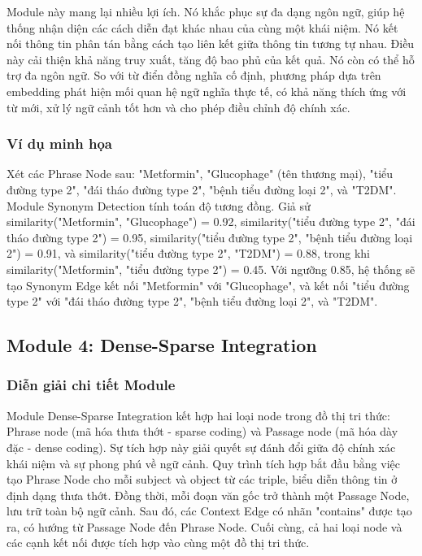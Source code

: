 \documentclass{article}
\begin{document}
Module này mang lại nhiều lợi ích. Nó khắc phục sự đa dạng ngôn ngữ, giúp hệ thống nhận diện các cách diễn đạt khác nhau của cùng một khái niệm. Nó kết nối thông tin phân tán bằng cách tạo liên kết giữa thông tin tương tự nhau. Điều này cải thiện khả năng truy xuất, tăng độ bao phủ của kết quả. Nó còn có thể hỗ trợ đa ngôn ngữ. So với từ điển đồng nghĩa cố định, phương pháp dựa trên embedding phát hiện mối quan hệ ngữ nghĩa thực tế, có khả năng thích ứng với từ mới, xử lý ngữ cảnh tốt hơn và cho phép điều chỉnh độ chính xác.

\subsubsection{Ví dụ minh họa}
Xét các Phrase Node sau: "Metformin", "Glucophage" (tên thương mại), "tiểu đường type 2", "đái tháo đường type 2", "bệnh tiểu đường loại 2", và "T2DM". Module Synonym Detection tính toán độ tương đồng. Giả sử similarity("Metformin", "Glucophage") = 0.92, similarity("tiểu đường type 2", "đái tháo đường type 2") = 0.95, similarity("tiểu đường type 2", "bệnh tiểu đường loại 2") = 0.91, và similarity("tiểu đường type 2", "T2DM") = 0.88, trong khi similarity("Metformin", "tiểu đường type 2") = 0.45. Với ngưỡng 0.85, hệ thống sẽ tạo Synonym Edge kết nối "Metformin" với "Glucophage", và kết nối "tiểu đường type 2" với "đái tháo đường type 2", "bệnh tiểu đường loại 2", và "T2DM".

\subsection{Module 4: Dense-Sparse Integration}

\subsubsection{Diễn giải chi tiết Module}
Module Dense-Sparse Integration kết hợp hai loại node trong đồ thị tri thức: Phrase node (mã hóa thưa thớt - sparse coding) và Passage node (mã hóa dày đặc - dense coding). Sự tích hợp này giải quyết sự đánh đổi giữa độ chính xác khái niệm và sự phong phú về ngữ cảnh. Quy trình tích hợp bắt đầu bằng việc tạo Phrase Node cho mỗi subject và object từ các triple, biểu diễn thông tin ở định dạng thưa thớt. Đồng thời, mỗi đoạn văn gốc trở thành một Passage Node, lưu trữ toàn bộ ngữ cảnh. Sau đó, các Context Edge có nhãn "contains" được tạo ra, có hướng từ Passage Node đến Phrase Node. Cuối cùng, cả hai loại node và các cạnh kết nối được tích hợp vào cùng một đồ thị tri thức.
\end{document}

